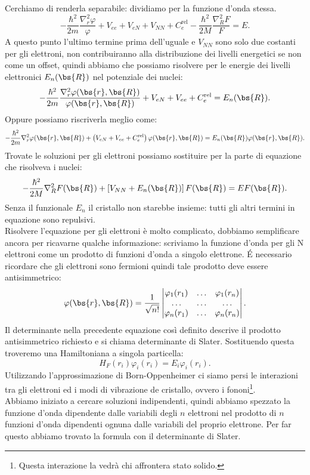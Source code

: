 Cerchiamo di renderla separabile: dividiamo per la funzione d'onda stessa.
\[
	-\frac{\hbar ^2}{2m}\frac{\nabla_r^2\varphi}{\varphi} +
	V_{ee} + V _{eN} + V_{NN} + C_e^{\text{rel}} -
	\frac{\hbar ^2}{2M}\frac{\nabla_R^2F}{F} = E
.\] 
A questo punto l'ultimo termine prima dell'uguale e $V_{NN}$ sono solo due costanti per gli elettroni, non contribuiranno alla distribuzione dei livelli energetici se non come un offset, quindi abbiamo che possiamo risolvere per le energie dei livelli elettronici $E_n(\bs{R})$ nel potenziale dei nuclei:
\[
	-\frac{\hbar ^2}{2m}
	\frac{\nabla_r^2 \varphi(\bs{r},\bs{R})}{\varphi(\bs{r},\bs{R})} +
	V_{eN} + V_{ee} + C_e^{\text{rel}} = E_n(\bs{R})
.\] 
Oppure possiamo riscriverla meglio come:
\[
	-\frac{\hbar ^2}{2m}
	\nabla_r^2 \varphi(\bs{r},\bs{R}) +
	\left( V_{eN} + V_{ee} + C_e^{\text{rel}} \right)
	\varphi(\bs{r},\bs{R}) = E_n(\bs{R})\varphi(\bs{r}, \bs{R})
.\] 
Trovate le soluzioni per gli elettroni possiamo sostituire per la parte di equazione che risolveva i nuclei:
\[
	-\frac{\hbar ^2}{2M}\nabla_R^2F(\bs{R})+
	\left[ V_{NN}+E_n(\bs{R}) \right] F(\bs{R})=
	E F(\bs{R})
.\] 
Senza il funzionale $E_n$ il cristallo non starebbe insieme: tutti gli altri termini in equazione sono repulsivi.\\
Risolvere l'equazione per gli elettroni è molto complicato, dobbiamo semplificare ancora per ricavarne qualche informazione: scriviamo la funzione d'onda per gli N elettroni come un prodotto di funzioni d'onda a singolo elettrone. É necessario ricordare che gli elettroni sono fermioni quindi tale prodotto deve essere antisimmetrico:
\[
	\varphi(\bs{r},\bs{R}) =
	\frac{1}{\sqrt{n!}}
	\begin{vmatrix}
		\varphi_1(r_1) 	& \ldots 	& \varphi_1(r_n)\\
		\ldots		& \ldots	&\ldots	\\
		\varphi_n(r_1)	&\ldots		& \varphi_n(r_n)
	\end{vmatrix}
.\] 
Il determinante nella precedente equazione così definito descrive il prodotto antisimmetrico richiesto e si chiama determinante di Slater.
Sostituendo questa troveremo una Hamiltoniana a singola particella:
\[
	H_{F}(r_i)\varphi_i(r_i) = 
	E_i \varphi_i(r_i)
.\] 
Utilizzando l'approssimazione di Born-Oppenheimer ci siamo persi le interazioni tra gli elettroni ed i modi di vibrazione de cristallo, ovvero i fononi\footnote{Questa interazione la vedrà chi affrontera stato solido.}.\\
Abbiamo iniziato a cercare soluzioni indipendenti, quindi abbiamo spezzato la funzione d'onda dipendente dalle variabili degli $n$ elettroni nel prodotto di $n$ funzioni d'onda dipendenti ognuna dalle variabili del proprio elettrone. Per far questo abbiamo trovato la formula con il determinante di Slater.
